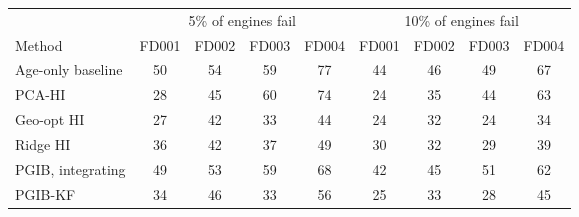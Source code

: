 \begin{tabular}{l c c c c c c c c}
\hline
& \multicolumn{4}{c}{5\% of engines fail} & \multicolumn{4}{c}{10\% of engines fail} \\
Method & FD001 & FD002 & FD003 & FD004 & FD001 & FD002 & FD003 & FD004 \\
\hline
Age-only baseline & 50 & 54 & 59 & 77 & 44 & 46 & 49 & 67 \\
PCA-HI & 28 & 45 & 60 & 74 & 24 & 35 & 44 & 63 \\
Geo-opt HI & 27 & 42 & 33 & 44 & 24 & 32 & 24 & 34 \\
Ridge HI & 36 & 42 & 37 & 49 & 30 & 32 & 29 & 39 \\
PGIB, integrating & 49 & 53 & 59 & 68 & 42 & 45 & 51 & 62 \\
PGIB-KF & 34 & 46 & 33 & 56 & 25 & 33 & 28 & 45 \\
\hline
\end{tabular}
